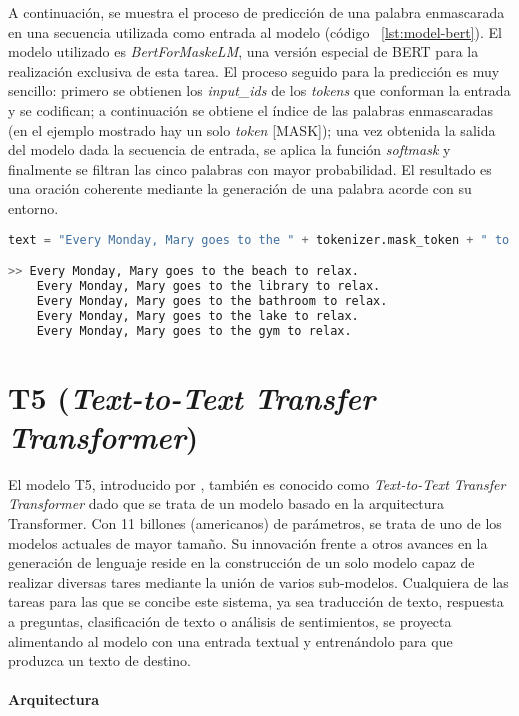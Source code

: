 A continuación, se muestra el proceso de predicción de una palabra enmascarada en una secuencia utilizada como entrada al modelo (código ~\ref{lst:model-bert}). El modelo utilizado es \textit{BertForMaskeLM}, una versión especial de BERT para la realización exclusiva de esta tarea. El proceso seguido para la predicción es muy sencillo: primero se obtienen los \textit{input\_ids} de los \textit{tokens} que conforman la entrada y se codifican; a continuación se obtiene el índice de las palabras enmascaradas (en el ejemplo mostrado hay un solo \textit{token} [MASK]); una vez obtenida la salida del modelo dada la secuencia de entrada, se aplica la función \textit{softmask} y finalmente se filtran las cinco palabras con mayor probabilidad. El resultado es una oración coherente mediante la generación de una palabra acorde con su entorno.

\begin{lstlisting}[language=Python, caption=Ejemplo de predicción de una palabra enmascarada en una secuencia, label={lst:model-bert}]
	text = "Every Monday, Mary goes to the " + tokenizer.mask_token + " to relax."

>> Every Monday, Mary goes to the beach to relax.
	Every Monday, Mary goes to the library to relax.
	Every Monday, Mary goes to the bathroom to relax.
	Every Monday, Mary goes to the lake to relax.
	Every Monday, Mary goes to the gym to relax.
\end{lstlisting} 


\section{T5 (\textit{Text-to-Text Transfer Transformer})}
El modelo T5, introducido por \citep{2020t5}, también es conocido como \textit{Text-to-Text Transfer Transformer} dado que se trata de un modelo basado en la arquitectura Transformer. Con 11 billones (americanos) de parámetros, se trata de uno de los modelos actuales de mayor tamaño. Su innovación frente a otros avances en la generación de lenguaje reside en la construcción de un solo modelo capaz de realizar diversas tares mediante la unión de varios sub-modelos. Cualquiera de las tareas para las que se concibe este sistema, ya sea traducción de texto, respuesta a preguntas, clasificación de texto o análisis de sentimientos, se proyecta alimentando al modelo con una entrada textual y entrenándolo para que produzca un texto de destino. 



\paragraph{Arquitectura}\hfill

